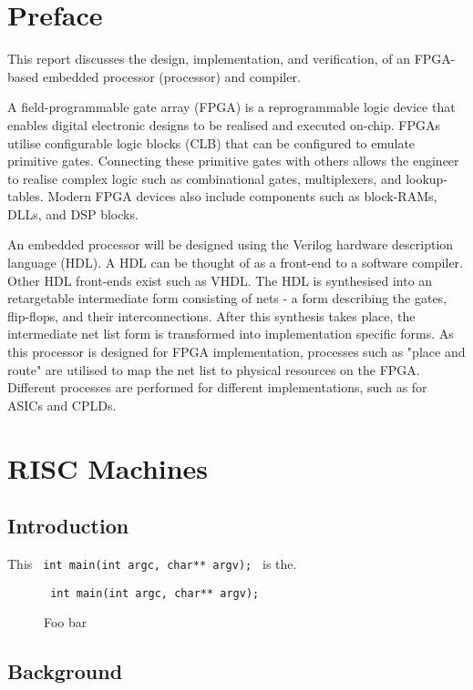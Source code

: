 \documentclass[11pt,a4paper]{report}
\begin{document}
\chapter*{Preface}
\label{sect:preface}
This report discusses the design, implementation, and verification, of an FPGA-based embedded processor (processor) and compiler.


A field-programmable gate array (FPGA) is a reprogrammable logic device that enables digital electronic designs to be realised and executed on-chip. FPGAs utilise configurable logic blocks (CLB) that can be configured to emulate primitive gates. Connecting these primitive gates with others allows the engineer to realise complex logic such as combinational gates, multiplexers, and lookup-tables. Modern FPGA devices also include components such as block-RAMs, DLLs, and DSP blocks.

An embedded processor will be designed using the Verilog hardware description language (HDL). A HDL can be thought of as a front-end to a software compiler. Other HDL front-ends exist such as VHDL. The HDL is synthesised into an retargetable intermediate form consisting of nets - a form describing the gates, flip-flops, and their interconnections. After this synthesis takes place, the intermediate net list form is transformed into implementation specific forms. As this processor is designed for FPGA implementation, processes such as "place and route" are utilised to map the net list to physical resources on the FPGA. Different processes are performed for different implementations, such as for ASICs and CPLDs.

\newpage
\chapter{RISC Machines}
{%
\startcontents[chapters]
}

\section{Introduction}
\lipsum[1]

This \texttt{
int main(int argc, char** argv);
} is the.

\begin{figure}[H]
\centering
\texttt{
int main(int argc, char** argv);
}
\caption{Foo bar}
\end{figure}
\lipsum[2]

\section{Background}
\lipsum[1-2]
\end{document}
